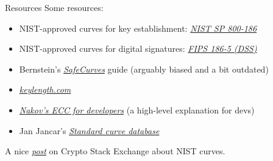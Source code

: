 \begin{frame}{Resources}
  Some resources:
  \begin{itemize}[<+(1)->]
    \item NIST-approved curves for key establishment: \href{https://csrc.nist.gov/pubs/sp/800/186/final}{\textit{NIST SP 800-186}}
    \item NIST-approved curves for digital signatures: \href{https://csrc.nist.gov/pubs/fips/186-5/final}{\textit{FIPS 186-5 (DSS)}}
    \item Bernstein's \href{https://safecurves.cr.yp.to}{\emph{SafeCurves}} guide (arguably biased and a bit outdated)
    \item \href{https://www.keylength.com/en/}{\textit{keylength.com}}
    \item \href{https://cryptobook.nakov.com/asymmetric-key-ciphers/elliptic-curve-cryptography-ecc}{\textit{Nakov's ECC for developers}} (a high-level explanation for devs)
    \item Jan Jancar's \href{https://neuromancer.sk/std/}{\textit{Standard curve database}}
  \end{itemize}

  \pause
  A nice \href{https://crypto.stackexchange.com/questions/93519/why-are-nist-curves-still-used}{\textit{post}} on Crypto Stack Exchange about NIST curves.
\end{frame}


